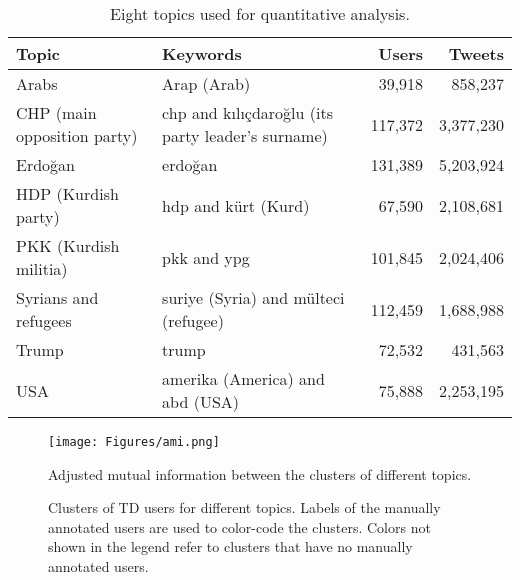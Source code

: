 \documentclass[letterpaper]{article} \usepackage{aaai20}  \usepackage{times}  \usepackage{stackengine}
\begin{document}
\begin{table}[htp]
    \centering
    \small
\begin{tabularx}{\linewidth}{X|X|r|r}
Topic & Keywords & Users & Tweets \\ \hline
Arabs & Arap (Arab) & 39,918 & 858,237 \\ \hline
    CHP (main opposition party) & chp and k{\i}l{\i}\c{c}daro\u{g}lu (its party leader's surname) & 117,372	& 3,377,230 \\ \hline
    Erdo\u{g}an & erdo\u{g}an  & 131,389 & 5,203,924 \\ \hline
    HDP (Kurdish party) & hdp  and k\"{u}rt (Kurd) & 67,590	& 2,108,681 \\ \hline
    PKK (Kurdish militia) & pkk and ypg & 101,845 & 2,024,406 \\ \hline
    Syrians and refugees &  suriye (Syria) and m\"{u}lteci (refugee) & 112,459	& 1,688,988\\ \hline
    Trump & trump & 72,532 & 431,563 \\ \hline
    USA & amerika (America) and abd (USA) & 75,888 & 2,253,195\\ \hline
\end{tabularx}
\caption{Eight topics used for quantitative analysis.}
    \label{tab:topics}
\end{table}

\begin{figure}[!htb]
    \texttt{[image: Figures/ami.png]}
    \caption{Adjusted mutual information between the clusters of different topics.}
    \label{fig:nmi}
\end{figure}

\begin{figure*}[pt]
    \centering 
    
    
    
    
    
    
    \caption{Clusters of TD users for different topics. Labels of the manually annotated users are used to color-code the clusters. Colors not shown in the legend refer to clusters that have no manually annotated users.}
    \label{fig:targetClusters}
\end{figure*}
\end{document}
